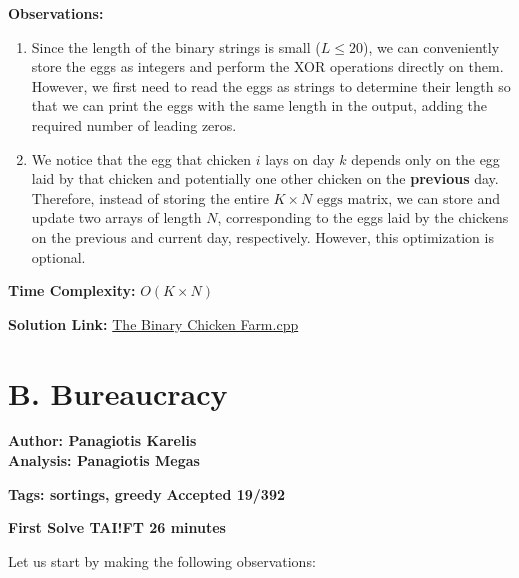 \documentclass{article}
\begin{document}
\textbf{Observations:}
\begin{enumerate}
    \item Since the length of the binary strings is small (\(L \leq 20\)), we can conveniently store the eggs as integers and perform the XOR operations directly on them. However, we first need to read the eggs as strings to determine their length so that we can print the eggs with the same length in the output, adding the required number of leading zeros. 
    \item We notice that the egg that chicken \(i\) lays on day \(k\) depends only on the egg laid by that chicken and potentially one other chicken on the \textbf{previous} day. Therefore, instead of storing the entire \(K \times N\) \(\text{eggs}\) matrix, we can store and update two arrays of length \(N\), corresponding to the eggs laid by the chickens on the previous and current day, respectively. However, this optimization is optional.

\end{enumerate}

\vspace{1em}

\textbf{Time Complexity:}
$O(K \times N)$

\vspace{1em}
\noindent \textbf{Solution Link:} 
\href{https://github.com/StathisKons/GRCPC-2024-Editorial-Implementations/blob/main/A.%20The%20Binary%20Chicken%20Farm.cpp}{The Binary Chicken Farm.cpp}


\vspace{5em}

\newpage 

\section*{B. Bureaucracy}

\textbf{Author: Panagiotis Karelis} \\
\textbf{Analysis: Panagiotis Megas}

\vspace{2em}

\noindent
\textbf{Tags: sortings, greedy} \hfill \textbf{Accepted 19/392}

\hfill \textbf{First Solve TAI!FT 26 minutes}

\vspace{2em}

\noindent Let us start by making the following observations:

\vspace{1em}
\end{document}

